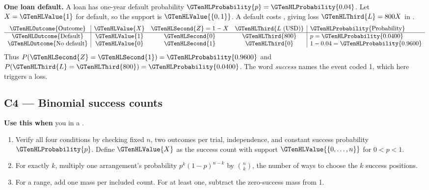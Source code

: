 \textbf{One loan default.} A loan has one-year default probability \(\GTenHLProbability{p}=\GTenHLProbability{0.04}\). Let \(X=\GTenHLValue{1}\) for default, so the support is \(\GTenHLValue{\{0,1\}}\). A default costs , giving loss \(\GTenHLThird{L}=800X\) in .
\[
\begin{array}{c|ccc|l}
\GTenHLOutcome{\text{Outcome}} & \GTenHLValue{X} & \GTenHLSecond{Z}=1-X & \GTenHLThird{L\text{ (USD)}} & \GTenHLProbability{\text{Probability}}\\ \hline
\GTenHLOutcome{\text{Default}} & \GTenHLValue{1} & \GTenHLSecond{0} & \GTenHLThird{800} & p=\GTenHLProbability{0.0400}\\
\GTenHLOutcome{\text{No default}} & \GTenHLValue{0} & \GTenHLSecond{1} & \GTenHLThird{0} & 1-0.04=\GTenHLProbability{0.9600}
\end{array}
\]
Thus \(P(\GTenHLSecond{Z}=\GTenHLSecond{1})=\GTenHLProbability{0.9600}\) and \(P(\GTenHLThird{L}=\GTenHLThird{800})=\GTenHLProbability{0.0400}\). The word \emph{success} names the event coded 1, which here triggers a loss.
\par\nobreak
{}

\subsection{C4 --- Binomial success counts}\label{crit:C4}
\textbf{Use this when} you  in a .

\begin{enumerate}
\item Verify all four conditions by checking fixed \(n\), two outcomes per trial, independence, and constant success probability \(\GTenHLProbability{p}\). Define \(\GTenHLValue{X}\) as the success count with support \(\GTenHLValue{\{0,\ldots,n\}}\) for \(0<p<1\).
\item For exactly \(k\), multiply one arrangement's probability \(p^k(1-p)^{n-k}\) by \(\binom nk\), the number of ways to choose the \(k\) success positions.
\item For a range, add one mass per included count. For at least one, subtract the zero-success mass from 1.
\end{enumerate}

